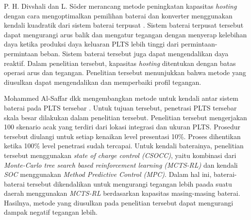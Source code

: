 {{{{{P. H. Divshali dan L. S\"{o}der merancang metode peningkatan kapasitas \textit{hosting} dengan cara mengoptimalkan pemilihan baterai dan konverter menggunakan kendali kuadratik dari sistem baterai terpusat \cite{Hasanpor2019}. Sistem baterai terpusat tersebut dapat mengurangi arus balik dan mengatur tegangan dengan menyerap kelebihan daya ketika produksi daya keluaran PLTS lebih tinggi dari permintaan-permintaan beban. Sistem baterai tersebut juga dapat mengendalikan daya reaktif. Dalam penelitian tersebut, kapasitas \textit{hosting} ditentukan dengan batas operasi arus dan tegangan. Penelitian tersebut menunjukkan bahwa metode yang diusulkan dapat mengendalikan dan memperbaiki profil tegangan.

Mohammed Al-Saffar dkk mengembangkan metode untuk kendali antar sistem baterai pada PLTS tersebar \cite{Al-Saffar2020}. Untuk tujuan tersebut, penetrasi PLTS tersebar skala besar dilakukan dalam penelitian tersebut. Penelitian tersebut mengerjakan 100 skenario acak yang terdiri dari lokasi integrasi dan ukuran PLTS. Prosedur tersebut diulangi untuk setiap kenaikan level presentasi 10\%. Proses dihentikan ketika 100\% level penetrasi sudah tercapai. Untuk kendali baterainya, penelitian tersebut menggunakan \textit{state of charge control (CSOCC)}, yaitu kombinasi dari \textit{Monte-Carlo tree search based reinforcement learning (MCTS-RL)} dan kendali \textit{SOC} menggunakan \textit{Method Predictive Control (MPC)}. Dalam hal ini, baterai-baterai tersebut dikendalikan untuk mengurangi tegangan lebih paada suatu daerah menggunakan \textit{MCTS-RL} berdasarkan kapasitas masing-masing baterai. Hasilnya, metode yang diusulkan pada penelitian tersebut dapat mengurangi dampak negatif tegangan lebih.


}}}}}
